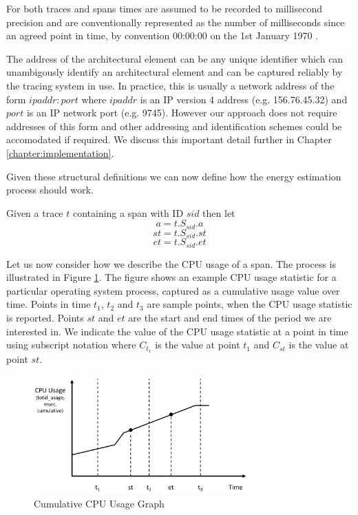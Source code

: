For both traces and spans times are assumed to be recorded to millisecond precision and are conventionally represented as the number of milliseconds since an agreed point in time, by convention 00:00:00 on the 1st January 1970 \cite{josey2004-ieee1003}.

The address of the architectural element can be any unique identifier which can unambigously identify an architectural element and can be captured reliably by the tracing system in use.  In practice, this is usually a network address of the form $ipaddr:port$ where $ipaddr$ is an IP version 4 address (e.g. 156.76.45.32) and $port$ is an IP network port (e.g. 9745).  However our approach does not require addresses of this form and other addressing and identification schemes could be accomodated if required.  We discuss this important detail further in Chapter \ref{chapter:implementation}.

Given these structural definitions we can now define how the energy estimation process should work.

Given a trace $t$ containing a span with ID $sid$ then let
\begin{equation}
a = t.S_{sid}.a
\end{equation}
\begin{equation}
st = t.S_{sid}.st
\end{equation}
\begin{equation}
et = t.S_{sid}.et
\end{equation}

Let us now consider how we describe the CPU usage of a span.  The process is illustrated in Figure \ref{figure:graph}.  The figure shows an example CPU usage statistic for a particular operating system process, captured as a cumulative usage value over time.  Points in time $t_{1}$, $t_{2}$ and $t_{3}$ are sample points, when the CPU usage statistic is reported.  Points $st$ and $et$ are the start and end times of the period we are interested in.  We indicate the value of the CPU usage statistic at a point in time using subscript notation where $C_{t_{1}}$ is the value at point $t_{1}$ and $C_{st}$ is the value at point $st$.

\begin{figure}
\centering
\includegraphics[width=0.75\textwidth]{Figures/estimating-energy-graph}
\caption{Cumulative CPU Usage Graph}
\label{figure:graph}
\end{figure}

